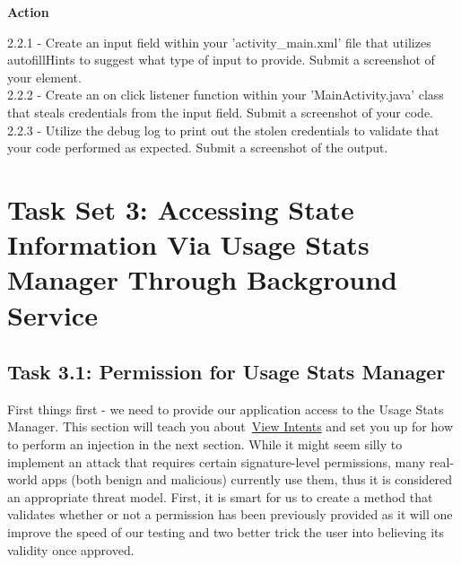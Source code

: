\documentclass[letterpaper,12pt]{report}
\begin{document}
\bigskip
\begin{mdframed}[backgroundcolor=blue!10,style=code,nobreak=true,align=center,userdefinedwidth=14cm]

\textbf{Action}
\bigskip

2.2.1 - Create an input field within your 'activity\_main.xml' file that utilizes autofillHints to suggest what type of input to provide. Submit a screenshot of your element.\\
2.2.2 - Create an on click listener function within your 'MainActivity.java' class that steals credentials from the input field. Submit a screenshot of your code.\\
2.2.3 - Utilize the debug log to print out the stolen credentials to validate that your code performed as expected. Submit a screenshot of the output.\\
\end{mdframed}


\section*{Task Set 3: Accessing State Information Via Usage Stats Manager Through Background Service}\label{sec:Task 3: Accessing State Information Via Usage Stats Manager Through Background Service}

\subsection*{Task 3.1: Permission for Usage Stats Manager}

First things first - we need to provide our application access to the Usage Stats Manager. This section will teach you about~\href{https://developer.android.com/training/basics/intents/sending}{View Intents} and set you up for how to perform an injection in the next section. While it might seem silly to implement an attack that requires certain signature-level permissions, many real-world apps (both benign and malicious) currently use them, thus it is considered an appropriate threat model. First, it is smart for us to create a method that validates whether or not a permission has been previously provided as it will one improve the speed of our testing and two better trick the user into believing its validity once approved.
\end{document}
